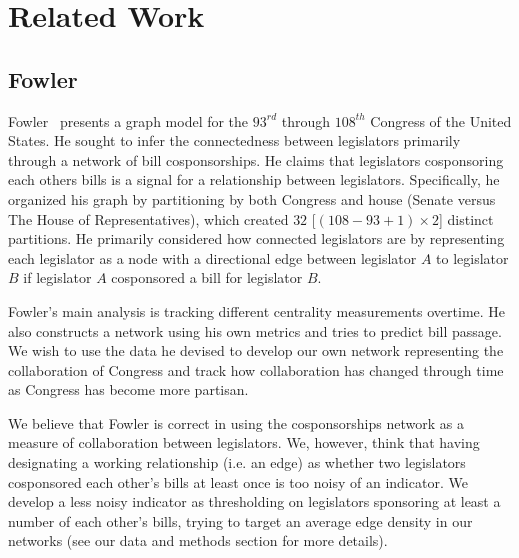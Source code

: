 \section{Related Work}

\subsection{Fowler}

Fowler~\cite{Fowler} presents a graph model for the $93^{rd}$ through $108^{th}$
Congress of the United  States. He sought to infer the connectedness between
legislators primarily  through a network of bill cosponsorships. He claims that
legislators  cosponsoring each others bills is a signal for a relationship
between legislators. Specifically, he organized his graph by partitioning by
both Congress and house  (Senate versus The House of Representatives), which
created $32$  [$(108 - 93 + 1) \times 2$] distinct partitions. He primarily
considered how  connected legislators are by representing each legislator as a
node with a  directional edge between legislator $A$ to legislator $B$ if
legislator $A$  cosponsored a bill for legislator $B$.

Fowler's main analysis is tracking different centrality measurements overtime.
He also constructs a network using his own metrics and tries to predict bill
passage. We wish to use the data he devised to develop our own network
representing the collaboration of Congress and track how collaboration has
changed through time as Congress has become more partisan.

We believe that Fowler is correct in using the cosponsorships network as a
measure of collaboration between legislators. We, however, think that having
designating a working relationship (i.e. an edge) as whether two legislators
cosponsored each other's bills at least once is too noisy of an indicator. We
develop a less noisy indicator as thresholding on legislators sponsoring at
least a number of each other's bills, trying to target an average edge density
in our networks (see our data and methods section for more details).




